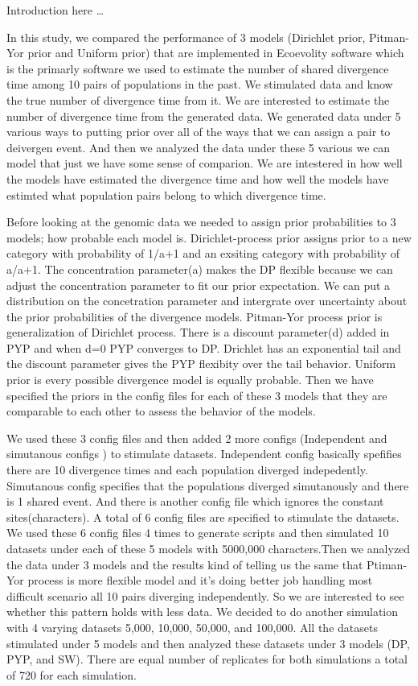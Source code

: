 Introduction here \ldots

In this study, we compared the performance of 3 models (Dirichlet prior, Pitman-Yor prior and Uniform prior) 
that are implemented in Ecoevolity software which is the primarly software we used to estimate the number of shared divergence time among 10 pairs of
 populations in the past. We stimulated data and know the true number of divergence time from it. We are interested to estimate the number of 
divergence time from the generated data. We generated data under 5 various ways to putting prior over all of the ways that we can assign a pair to deivergen event. And then we analyzed the data under these 5 various we can model that just we have some sense of comparion. We are intestered in how well 
the models have estimated the divergence time and how well the models have estimted what population pairs belong to which divergence time. 

Before looking at the genomic data we needed to assign prior probabilities to 3 models; how probable each model is. Dirichlet-process prior assigns prior 
to a new category with probability of 1/a+1 and an exsiting category with probability of a/a+1. The concentration parameter(a) makes the DP flexible
because we can adjust the concentration parameter to fit our prior expectation. We can put a distribution on the concetration parameter and intergrate 
over uncertainty about the prior probabilities of the divergence models. Pitman-Yor process prior is generalization of Dirichlet process. 
There is a discount parameter(d) added in PYP and when d=0 PYP converges to DP. Drichlet has an exponential tail and the discount parameter gives the PYP flexibity
over the tail behavior. Uniform prior is every possible divergence model is equally probable. Then we have specified the priors in the config files
for each of these 3 models that they are comparable to each other to assess the behavior of the models. 

We used these 3 config files and then added 2 more configs (Independent and simutanous configs ) to stimulate datasets. Independent config basically spefifies 
there are 10 divergence times and each population diverged indepedently. Simutanous config specifies that the populations diverged simutanously and 
there is 1 shared event. And there is another config file which ignores the constant sites(characters). A total of 6 config files are specified to 
stimulate the datasets. We used these 6 config files 4 times to generate scripts and then simulated 10 datasets under each of these 5 models with 5000,000
characters.Then we analyzed the data under 3 models and the results kind of telling us the same that Ptiman-Yor process is more flexible model and 
it's doing better job handling most difficult scenario all 10 pairs diverging independently. So we are interested to see whether this pattern holds with 
less data. We decided to do another simulation with 4 varying datasets 5,000, 10,000, 50,000, and 100,000. All the datasets stimulated under 5 models and 
then analyzed these datasets under 3 models (DP, PYP, and SW). There are equal number of replicates for both simulations a total of 720 for each simulation.
 



 
 
      

